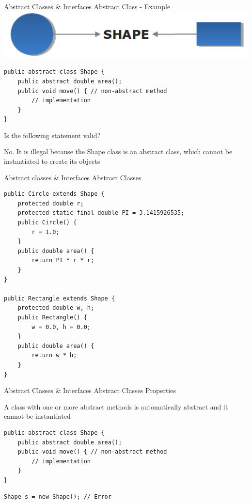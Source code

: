 \documentclass[14pt]{beamer}
\begin{document}
\begin{frame}[fragile]{Abstract Classes \& Interfaces}
Abstract Class - Example
 \includegraphics[scale=.4]{abstract-shape.png}
\begin{lstlisting}[numbers=none,  basicstyle=\tiny, frame=single, framexleftmargin=15pt]
public abstract class Shape {
    public abstract double area(); 
    public void move() { // non-abstract method
        // implementation
    }
}
 \end{lstlisting}
 Is the following statement valid?
 
 
 No. It is illegal because the Shape class is an abstract class, which cannot be instantiated to create its objects
\end{frame}


\begin{frame}[fragile]{Abstract classes \& Interfaces}
 Abstract Classes
 \begin{lstlisting}[numbers=none,  basicstyle=\tiny]
public Circle extends Shape {
    protected double r;
    protected static final double PI = 3.1415926535;
    public Circle() {
        r = 1.0; 
    }
    public double area() { 
        return PI * r * r; 
    }
}

public Rectangle extends Shape {
    protected double w, h;
    public Rectangle() { 
        w = 0.0, h = 0.0; 
    } 
    public double area() {
        return w * h; 
    }
}
 \end{lstlisting}
\end{frame}

\begin{frame}[fragile]{Abstract Classes \& Interfaces}
Abstract Classes Properties

A class with one or more abstract methods is automatically abstract and it cannot be instantiated
\begin{lstlisting}[numbers=none,  basicstyle=\tiny, frame = single]
public abstract class Shape {
    public abstract double area(); 
    public void move() { // non-abstract method
        // implementation
    }
}
\end{lstlisting}
\lstinline!Shape s = new Shape(); // Error!
\end{frame}
\end{document}
